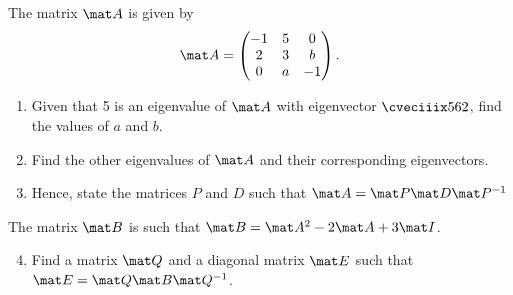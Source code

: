 \begin{problem}
    The matrix $\mat A$ is given by \[\mat A = \begin{pmatrix}-1 & 5 & 0 \\ 2 & 3 & b \\ 0 & a & -1\end{pmatrix}.\]

    \begin{enumerate}
        \item Given that 5 is an eigenvalue of $\mat A$ with eigenvector $\cveciiix562$, find the values of $a$ and $b$.
        \item Find the other eigenvalues of $\mat A$ and their corresponding eigenvectors.
        \item Hence, state the matrices $P$ and $D$ such that $\mat A = \mat P \mat D \mat P^{-1}$
    \end{enumerate}

    The matrix $\mat B$ is such that $\mat B = \mat A^2 - 2 \mat A + 3 \mat I$.

    \begin{enumerate}
        \setcounter{enumi}{3}
        \item Find a matrix $\mat Q$ and a diagonal matrix $\mat E$ such that $\mat E = \mat Q \mat B \mat Q^{-1}$.
    \end{enumerate}
\end{problem}
